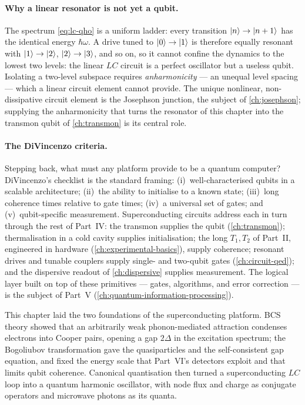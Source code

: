 \paragraph{Why a linear resonator is not yet a qubit.}
The spectrum \cref{eq:lc-qho} is a uniform ladder: every transition
$\ket n\to\ket{n+1}$ has the identical energy $\hbar\omega$. A drive
tuned to $\ket0\to\ket1$ is therefore equally resonant with
$\ket1\to\ket2$, $\ket2\to\ket3$, and so on, so it cannot confine the
dynamics to the lowest two levels: the linear $LC$ circuit is a
perfect oscillator but a useless qubit. Isolating a two-level
subspace requires \emph{anharmonicity} --- an unequal level spacing
--- which a linear circuit element cannot provide. The unique
nonlinear, non-dissipative circuit element is the Josephson junction,
the subject of \cref{ch:josephson}; supplying the anharmonicity that
turns the resonator of this chapter into the transmon qubit of
\cref{ch:transmon} is its central role.

\paragraph{The DiVincenzo criteria.}
Stepping back, what must any platform provide to be a quantum
computer? DiVincenzo's checklist is the standard framing:
(i)~well-characterised qubits in a scalable architecture;
(ii)~the ability to initialise to a known state;
(iii)~long coherence times relative to gate times;
(iv)~a universal set of gates; and
(v)~qubit-specific measurement. Superconducting circuits address each
in turn through the rest of Part~IV: the transmon supplies the qubit
(\cref{ch:transmon}); thermalisation in a cold cavity supplies
initialisation; the long $T_1,T_2$ of Part~II, engineered in hardware
(\cref{ch:experimental-basics}), supply coherence; resonant drives and
tunable couplers supply single- and two-qubit gates
(\cref{ch:circuit-qed}); and the dispersive readout of
\cref{ch:dispersive} supplies measurement. The logical layer built on
top of these primitives --- gates, algorithms, and error correction
--- is the subject of Part~V (\cref{ch:quantum-information-processing}).

This chapter laid the two foundations of the superconducting
platform. BCS theory showed that an arbitrarily weak phonon-mediated
attraction condenses electrons into Cooper pairs, opening a gap
$2\Delta$ in the excitation spectrum; the Bogoliubov transformation
gave the quasiparticles and the self-consistent gap equation, and
fixed the energy scale that Part~VI's detectors exploit and that
limits qubit coherence. Canonical quantisation then turned a
superconducting $LC$ loop into a quantum harmonic oscillator, with
node flux and charge as conjugate operators and microwave photons as
its quanta.

